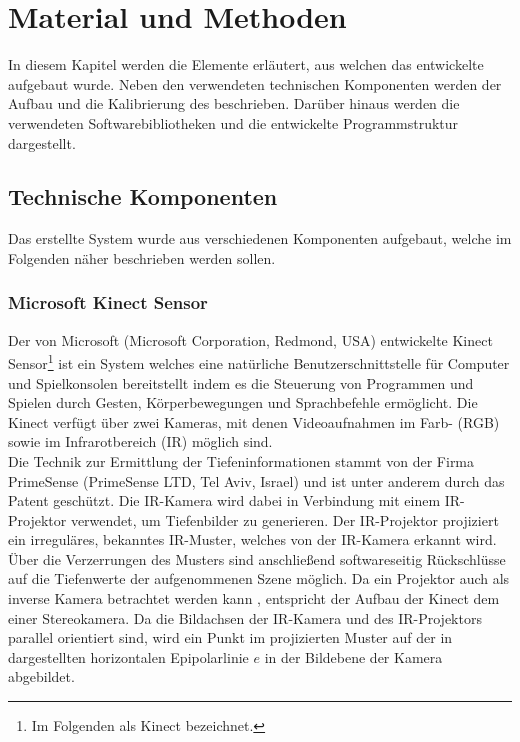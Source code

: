 \chapter{Material und Methoden}
\label{chap.material}
\prever{
\red[%
]%
}
In diesem Kapitel werden die Elemente erläutert, aus welchen das entwickelte \kps{} aufgebaut wurde. Neben den verwendeten technischen Komponenten werden der Aufbau und die Kalibrierung des  beschrieben. Darüber hinaus werden die verwendeten Softwarebibliotheken und die entwickelte Programmstruktur dargestellt.

\section{Technische Komponenten}
Das erstellte System wurde aus verschiedenen Komponenten aufgebaut, welche im Folgenden näher beschrieben werden sollen. 
\prever{
}
\subsection{Microsoft Kinect\textsuperscript{\texttrademark} Sensor}
\label{chap.kinect}
Der von Microsoft (Microsoft Corporation, Redmond, USA) entwickelte Kinect\textsuperscript{\texttrademark} Sensor\footnote{Im Folgenden als Kinect bezeichnet.} ist ein System welches eine natürliche Benutzerschnittstelle für Computer und Spielkonsolen bereitstellt indem es die Steuerung von Programmen und Spielen durch Gesten, Körperbewegungen und Sprachbefehle ermöglicht. Die Kinect verfügt über zwei Kameras, mit denen Videoaufnahmen im Farb- (RGB) sowie im Infrarotbereich (IR) möglich sind.\\
Die Technik zur Ermittlung der Tiefeninformationen stammt von der Firma PrimeSense (PrimeSense LTD, Tel Aviv, Israel) und ist unter anderem durch das Patent \cite{Freedman2008} geschützt. Die IR-Kamera wird dabei in Verbindung mit einem IR-Projektor verwendet, um Tiefenbilder zu generieren. Der IR-Projektor projiziert ein irreguläres, bekanntes IR-Muster, welches von der IR-Kamera erkannt wird. Über die Verzerrungen des Musters sind anschließend softwareseitig Rückschlüsse auf die Tiefenwerte der aufgenommenen Szene möglich. Da ein Projektor auch als inverse Kamera betrachtet werden kann \cite{Kimura2007}, entspricht der Aufbau der Kinect dem einer Stereokamera. Da die Bildachsen der IR-Kamera und des IR-Projektors parallel orientiert sind, wird ein Punkt im projizierten Muster auf der in  dargestellten horizontalen Epipolarlinie $e$ in der Bildebene der Kamera abgebildet. 

